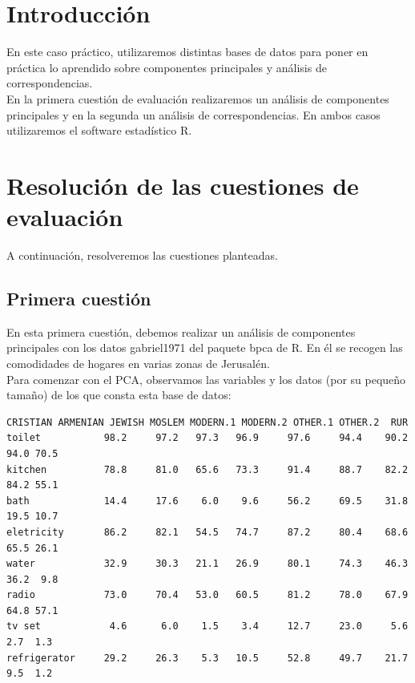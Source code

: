 \documentclass[12pt,a4paper,twoside,openright,titlepage,final]{article}
\author{José Ignacio Escribano}
\title{}
\begin{document}
\setcounter{page}{1}


\listoffigures
\thispagestyle{empty}
\newpage

\tableofcontents
\thispagestyle{empty}
\newpage


\setcounter{page}{1}

\section{Introducción}

En este caso práctico, utilizaremos distintas bases de datos para poner en práctica lo aprendido sobre componentes principales y análisis de correspondencias.\\

En la primera cuestión de evaluación realizaremos un análisis de componentes principales y en la segunda un análisis de correspondencias. En ambos casos utilizaremos el software estadístico R.

\section{Resolución de las cuestiones de evaluación}

A continuación, resolveremos las cuestiones planteadas.

\subsection{Primera cuestión}

En esta primera cuestión, debemos realizar un análisis de componentes principales con los datos gabriel1971 del paquete bpca de R. En él se recogen las comodidades de hogares en varias zonas de Jerusalén.\\

Para comenzar con el PCA, observamos las variables y los datos (por su pequeño tamaño) de los que consta esta base de datos:

\begin{Verbatim}[fontsize=\scriptsize]
             CRISTIAN ARMENIAN JEWISH MOSLEM MODERN.1 MODERN.2 OTHER.1 OTHER.2  RUR
toilet           98.2     97.2   97.3   96.9     97.6     94.4    90.2    94.0 70.5
kitchen          78.8     81.0   65.6   73.3     91.4     88.7    82.2    84.2 55.1
bath             14.4     17.6    6.0    9.6     56.2     69.5    31.8    19.5 10.7
eletricity       86.2     82.1   54.5   74.7     87.2     80.4    68.6    65.5 26.1
water            32.9     30.3   21.1   26.9     80.1     74.3    46.3    36.2  9.8
radio            73.0     70.4   53.0   60.5     81.2     78.0    67.9    64.8 57.1
tv set            4.6      6.0    1.5    3.4     12.7     23.0     5.6     2.7  1.3
refrigerator     29.2     26.3    5.3   10.5     52.8     49.7    21.7     9.5  1.2
\end{Verbatim}
\end{document}
